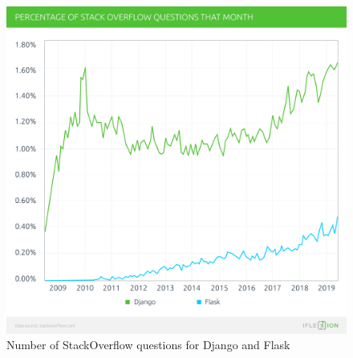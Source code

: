 \begin{figure}[!htb]
    \centering
    \includegraphics[scale=0.2]{Figures/djangovsFlask.png}
    \caption{Number of StackOverflow questions for Django and Flask}
    \label{fig:DjangovsFlask}
\end{figure}{}


